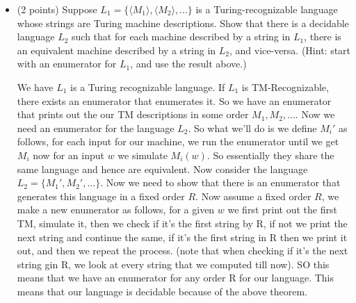 \documentclass[11pt]{article}
\begin{document}
\begin{enumerate}
\begin{itemize}
    \item (2 points) Suppose $L_1 = \{\langle M_1\rangle, \langle M_2\rangle, ...\}$ is a Turing-recognizable language whose strings are Turing machine descriptions.  Show that there is a decidable language $L_2$ such that for each machine described by a string in $L_1$, there is an equivalent machine described by a string in $L_2$, and vice-versa. (Hint: start with an enumerator for $L_1$, and use the result above.) \\
    
    \begin{answer}
        We have $L_{1}$ is a Turing recognizable language. If $L_{1}$  is TM-Recognizable, there exists an enumerator that enumerates it. So we have an enumerator that prints out the our TM descriptions in some order $M_{1}, M_{2}, \dots$. Now we need an enumerator for the language $L_{2}$. So what we'll do is we define $M_i'$ as follows, for each input for our machine, we run the enumerator until we get $M_i$ now for an input $w$ we simulate $M_i(w)$. So essentially they share the same language and hence are equivalent. Now consider the language $L_{2} = \{M_{1}', M_{2}', \dots\}$. Now we need to show that there is an enumerator that generates this language in a fixed order $R$. Now assume a fixed order $R$, we make a new enumerator as follows, for a given $w$ we first print out the first TM, simulate it, then we check if it's the first string by R, if not we print the next string and continue the same, if it's the first string in R then we print it out, and then we repeat the process. (note that when checking if it's the next string gin R, we look at every string  that we computed till now). SO this means that we have an enumerator for any order R for our language. This means that our language is decidable because of the above theorem.
    \end{answer}

\end{itemize}




\end{enumerate}
\end{document}

